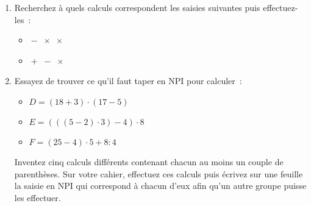 \begin{TP}
\begin{enumerate}

 \item Recherchez à quels calculs correspondent les saisies suivantes puis effectuez-les :
   \begin{itemize} 
  
  \vspace{1em}
  
  \item {} \quad {} \quad {} \quad {} \quad $\boxed{-}$ \quad {} \quad {} \quad $\boxed{\times}$ \quad {} \quad {} \quad $\boxed{\times}$\\[-0.75em]
  \item {} \quad {} \quad {} \quad {} \quad $\boxed{+}$ \quad {} \quad {} \quad {} \quad {} \quad $\boxed{-}$ \quad $\boxed{\times}$
  \end{itemize}
  
  \vspace{1em}
  
 \item Essayez de trouver ce qu'il faut taper en NPI pour calculer : 
 \begin{itemize}
  \item $D = (18 + 3) \cdot (17 - 5)$
  \item $E = (((5 - 2) \cdot 3) - 4) \cdot 8$
  \item $F = (25 - 4) \cdot 5 + 8 : 4$
  \end{itemize}
Inventez cinq calculs différents contenant chacun au moins un couple de parenthèses. Sur votre cahier, effectuez ces calculs puis écrivez sur une feuille la saisie en NPI qui correspond à chacun d'eux afin qu'un autre groupe puisse les effectuer.

 \end{enumerate}
 
\end{TP}

